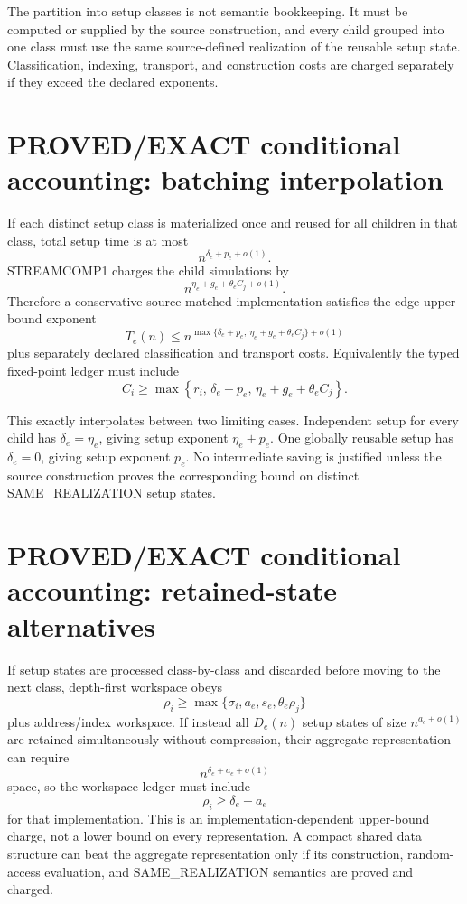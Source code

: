 \documentclass[11pt]{article}
\begin{document}
The partition into setup classes is not semantic bookkeeping. It must be computed or supplied by the source construction, and every child grouped into one class must use the same source-defined realization of the reusable setup state. Classification, indexing, transport, and construction costs are charged separately if they exceed the declared exponents.

\section*{PROVED/EXACT conditional accounting: batching interpolation}
If each distinct setup class is materialized once and reused for all children in that class, total setup time is at most
\[
n^{\delta_e+p_e+o(1)}.
\]
STREAMCOMP1 charges the child simulations by
\[
n^{\eta_e+g_e+\theta_e C_j+o(1)}.
\]
Therefore a conservative source-matched implementation satisfies the edge upper-bound exponent
\[
\boxed{
T_e(n)\le
n^{\max\{\delta_e+p_e,\ \eta_e+g_e+\theta_e C_j\}+o(1)}
}
\]
plus separately declared classification and transport costs. Equivalently the typed fixed-point ledger must include
\[
\boxed{
C_i\ge
\max\left\{
r_i,\,
\delta_e+p_e,\,
\eta_e+g_e+\theta_e C_j
\right\}.
}
\]

This exactly interpolates between two limiting cases. Independent setup for every child has $\delta_e=\eta_e$, giving setup exponent $\eta_e+p_e$. One globally reusable setup has $\delta_e=0$, giving setup exponent $p_e$. No intermediate saving is justified unless the source construction proves the corresponding bound on distinct SAME\_REALIZATION setup states.

\section*{PROVED/EXACT conditional accounting: retained-state alternatives}
If setup states are processed class-by-class and discarded before moving to the next class, depth-first workspace obeys
\[
\boxed{
\rho_i\ge
\max\{\sigma_i,a_e,s_e,\theta_e\rho_j\}
}
\]
plus address/index workspace. If instead all $D_e(n)$ setup states of size $n^{a_e+o(1)}$ are retained simultaneously without compression, their aggregate representation can require
\[
n^{\delta_e+a_e+o(1)}
\]
space, so the workspace ledger must include
\[
\boxed{\rho_i\ge\delta_e+a_e}
\]
for that implementation. This is an implementation-dependent upper-bound charge, not a lower bound on every representation. A compact shared data structure can beat the aggregate representation only if its construction, random-access evaluation, and SAME\_REALIZATION semantics are proved and charged.
\end{document}
